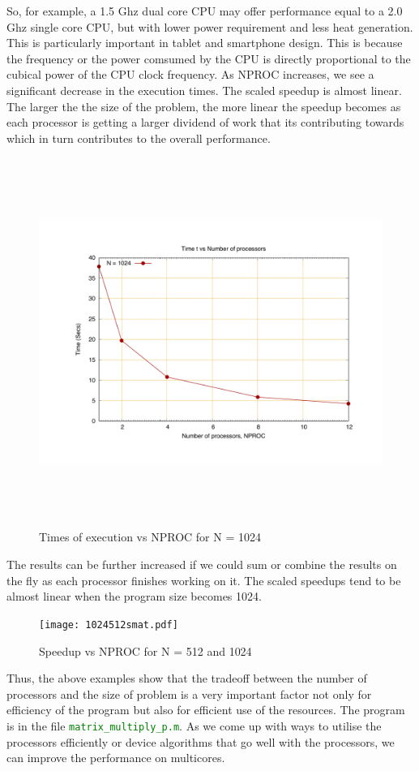 \documentclass[fleqn,letterpaper,12pt]{report}
\begin{document}
So, for example, a 1.5 Ghz dual core CPU may offer performance equal to a 2.0 Ghz single core CPU, but with lower power requirement and less heat generation. This is particularly important in tablet and smartphone design. This is because the frequency or the power comsumed by the CPU is directly proportional to the cubical power of the CPU clock frequency.
\newpage
As NPROC increases, we see a significant decrease in the execution times. The scaled speedup is almost linear. The larger the the size of the problem, the more linear the speedup becomes as each processor is getting a larger dividend of work that its contributing towards which in turn contributes to the overall performance. 
\begin{figure}[htbp]
	\centering
	\includegraphics[height=120mm,width=160mm]{1024.pdf}
	\caption{Times of execution vs NPROC for N = 1024\label{overflow}}
\end{figure}

The results can be further increased if we could sum or combine the results on the fly as each processor finishes working on it.
\newpage
The scaled speedups tend to be almost linear when the program size becomes 1024.
\begin{figure}[htbp]
	\centering
	\texttt{[image: 1024512smat.pdf]}
	\caption{Speedup vs NPROC for N = 512 and 1024\label{overflow}}
\end{figure}

Thus, the above examples show that the tradeoff between the number of processors and the size of problem is a very important factor not only for efficiency of the program but also for efficient use of the resources. The program is in the file {\tt\textcolor{Green}{matrix\_multiply\_p.m}}. As we come up with ways to utilise the processors efficiently or device algorithms that go well with the processors, we can improve the performance on multicores.
\vfill
\end{document}
